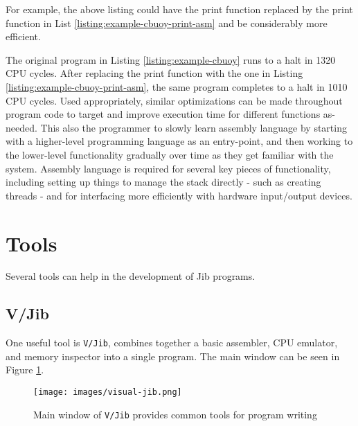 \documentclass{article}
\begin{document}
For example, the above listing could have the print function replaced by the print function in List \ref{listing:example-cbuoy-print-asm} and be considerably more efficient.



The original program in Listing \ref{listing:example-cbuoy} runs to a halt in 1320 CPU cycles. After replacing the print function with the one in Listing \ref{listing:example-cbuoy-print-asm}, the same program completes to a halt in 1010 CPU cycles. Used appropriately, similar optimizations can be made throughout program code to target and improve execution time for different functions as-needed. This also the programmer to slowly learn assembly language by starting with a higher-level programming language as an entry-point, and then working to the lower-level functionality gradually over time as they get familiar with the system. Assembly language is required for several key pieces of functionality, including setting up things to manage the stack directly - such as creating threads - and for interfacing more efficiently with hardware input/output devices.

\pagebreak

\section{Tools}

Several tools can help in the development of Jib programs.

\subsection{V/Jib}

One useful tool is \texttt{V/Jib}, combines together a basic assembler, CPU emulator, and memory inspector into a single program. The main window can be seen in Figure \ref{fig:visual-jib-main-page}.

\begin{figure}[h!]
    \centering
    \texttt{[image: images/visual-jib.png]}
    \caption{Main window of \texttt{V/Jib} provides common tools for program writing}
    \label{fig:visual-jib-main-page}
\end{figure}
\end{document}
